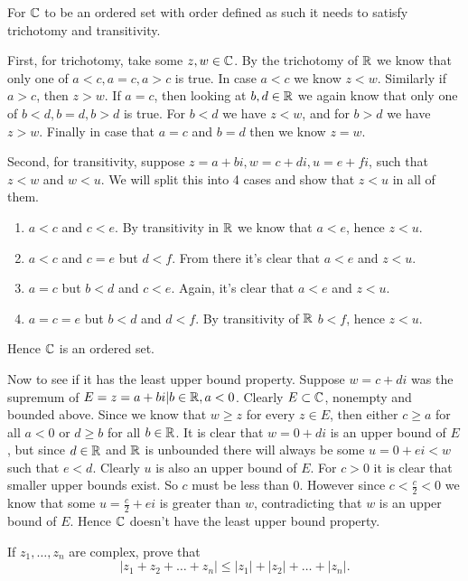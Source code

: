 \begin{solution}
  For $\mathbb{C}$ to be an ordered set with order defined as such it needs to satisfy trichotomy and transitivity.

  First, for trichotomy, take some $z, w \in \mathbb{C}$.
  By the trichotomy of $\mathbb{R}$ we know that only one of $a < c, a = c, a > c$ is true.
  In case $a < c$ we know $z < w$.
  Similarly if $a > c$, then $z > w$.
  If $a = c$, then looking at $b, d \in \mathbb{R}$ we again know that only one of $b < d, b = d, b > d$ is true.
  For $b < d$ we have $z < w$, and for $b > d$ we have $z > w$.
  Finally in case that $a = c$ and $b = d$ then we know $z = w$.

  Second, for transitivity, suppose $z = a + bi, w = c + di, u = e + fi$, such that $z < w$ and $ w < u$.
  We will split this into 4 cases and show that $z < u$ in all of them.
  \begin{enumerate}[label=\textbf{Case \arabic*:}]
    \item $a < c$ and $c < e$. By transitivity in $\mathbb{R}$ we know that $a < e$, hence $z < u$.
    \item $a < c$ and $c = e$ but $d < f$. From there it's clear that $a < e$ and $z < u$.
    \item $a = c$ but $b < d$ and $c < e$. Again, it's clear that $a < e$ and $z < u$.
    \item $a = c = e$ but $b < d$ and $d < f$. By transitivity of $\mathbb{R}$ $b < f$, hence $z < u$.
  \end{enumerate}
  
  Hence $\mathbb{C}$ is an ordered set.

  Now to see if it has the least upper bound property.
  Suppose $w = c + di$ was the supremum of $E = {z = a + bi | b \in \mathbb{R}, a < 0}$.
  Clearly $E \subset \mathbb{C}$, nonempty and bounded above.
  Since we know that $w \ge z$ for every $z \in E$, then either $c \ge a$ for all $a < 0$ or $d \ge b$ for all $b \in \mathbb{R}$.
  It is clear that $w = 0 + di$ is an upper bound of $E$, but since $d \in \mathbb{R}$ and $\mathbb{R}$ is unbounded there will always be some $u = 0 + ei < w$ such that $e < d$.
  Clearly $u$ is also an upper bound of $E$.
  For $c > 0$ it is clear that smaller upper bounds exist.
  So $c$ must be less than $0$.
  However since $c < \frac{c}{2} < 0$ we know that some $u = \frac{c}{2} + ei$ is greater than $w$, contradicting that $w$ is an upper bound of $E$.
  Hence $\mathbb{C}$ doesn't have the least upper bound property.
\end{solution}

\setcounter{problem}{11}
\begin{problem}
  If $z_1, \ldots, z_n$ are complex, prove that \[|z_1 + z_2 + \ldots + z_n| \le |z_1| + |z_2| + \ldots + |z_n|.\]
\end{problem}

